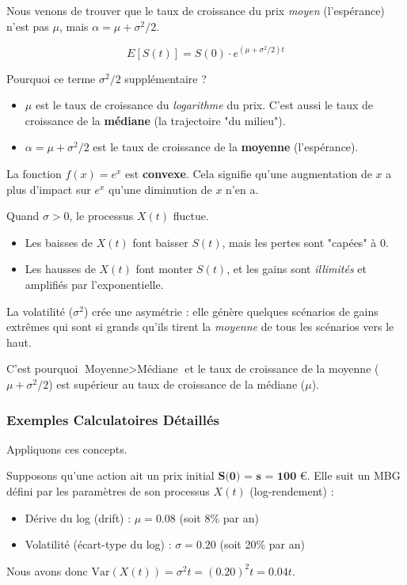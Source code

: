 \begin{intuitionbox}
Nous venons de trouver que le taux de croissance du prix \textit{moyen} (l'espérance) n'est pas $\mu$, mais $\alpha = \mu + \sigma^2/2$.

$$ E[S(t)] = S(0) \cdot e^{(\mu + \sigma^2/2)t} $$

Pourquoi ce terme $\sigma^2/2$ supplémentaire ?
\begin{itemize}
    \item $\mu$ est le taux de croissance du \textit{logarithme} du prix. C'est aussi le taux de croissance de la \textbf{médiane} (la trajectoire "du milieu").
    \item $\alpha = \mu + \sigma^2/2$ est le taux de croissance de la \textbf{moyenne} (l'espérance).
\end{itemize}
La fonction $f(x) = e^x$ est \textbf{convexe}. 
Cela signifie qu'une augmentation de $x$ a plus d'impact sur $e^x$ qu'une diminution de $x$ n'en a.

Quand $\sigma > 0$, le processus $X(t)$ fluctue.
\begin{itemize}
    \item Les baisses de $X(t)$ font baisser $S(t)$, mais les pertes sont "capées" à 0.
    \item Les hausses de $X(t)$ font monter $S(t)$, et les gains sont \textit{illimités} et amplifiés par l'exponentielle.
\end{itemize}
La volatilité ($\sigma^2$) crée une asymétrie : elle génère quelques scénarios de gains extrêmes qui sont si grands qu'ils tirent la \textit{moyenne} de tous les scénarios vers le haut.

C'est pourquoi $\text{Moyenne} > \text{Médiane}$ et le taux de croissance de la moyenne ($\mu + \sigma^2/2$) est supérieur au taux de croissance de la médiane ($\mu$).
\end{intuitionbox}

\subsubsection{Exemples Calculatoires Détaillés}

Appliquons ces concepts.

\begin{intuitionbox}
Supposons qu'une action ait un prix initial $\textbf{S(0) = s = 100 €}$.
Elle suit un MBG défini par les paramètres de son processus $X(t)$ (log-rendement) :
\begin{itemize}
    \item Dérive du log (drift) : $\mu = 0.08$ (soit 8\% par an)
    \item Volatilité (écart-type du log) : $\sigma = 0.20$ (soit 20\% par an)
\end{itemize}
Nous avons donc $\text{Var}(X(t)) = \sigma^2 t = (0.20)^2 t = 0.04 t$.
\end{intuitionbox}

